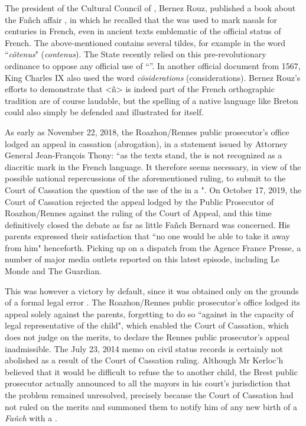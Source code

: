 \documentclass[output=paper,colorlinks,citecolor=brown]{langscibook}
\begin{document}
The president of the Cultural Council of , Bernez Rouz, published a book about the Fañch affair \citep{sm:Rouz2020}, in which he recalled that the  was used to mark nasals for centuries in French, even in ancient texts emblematic of the official status of French. The above-mentioned  contains several tildes, for example in the word ``\textit{cõtenus}" (\textit{contenus}). The State recently relied on this pre-revolutionary ordinance to oppose any official use of “”. In another official document from 1567, King Charles IX also used the word \textit{cõsiderations} (considerations). Bernez Rouz's efforts to demonstrate that <ñ> is indeed part of the French orthographic tradition are of course laudable, but the spelling of a native language like Breton could also simply be defended and illustrated for itself. 

As early as November 22, 2018, the Roazhon/Rennes public prosecutor's office lodged an appeal in cassation (abrogation), in a statement issued by Attorney General Jean-François Thony: ``as the texts stand, the  is not recognized as a diacritic mark in the French language. It therefore seems necessary, in view of the possible national repercussions of the aforementioned ruling, to submit to the Court of Cassation the question of the use of the  in a ". On October 17, 2019, the Court of Cassation rejected the appeal lodged by the Public Prosecutor of Roazhon/Rennes against the ruling of the Court of Appeal, and this time definitively closed the debate as far as little Fañch Bernard was concerned. His parents expressed their satisfaction that ``no one would be able to take it away from him" henceforth. Picking up on a dispatch from the Agence France Presse, a number of major media outlets reported on this latest episode, including Le Monde and The Guardian.

This was however a victory by default, since it was obtained only on the grounds of a formal legal error \citep{sm:LeMonde2019}. The Roazhon/Rennes public prosecutor's office lodged its appeal solely against the parents, forgetting to do so ``against in the capacity of legal representative of the child", which enabled the Court of Cassation, which does not judge on the merits, to declare the Rennes public prosecutor's appeal inadmissible. The July 23, 2014 memo on civil status records is certainly not abolished as a result of the Court of Cassation ruling. Although Mr Kerloc'h believed that it would be difficult to refuse the  to another child, the Brest public prosecutor actually announced to all the mayors in his court's jurisdiction that the problem remained unresolved, precisely because the Court of Cassation had not ruled on the merits and summoned them to notify him of any new birth of a \textit{Fañch} with a .
\end{document}

